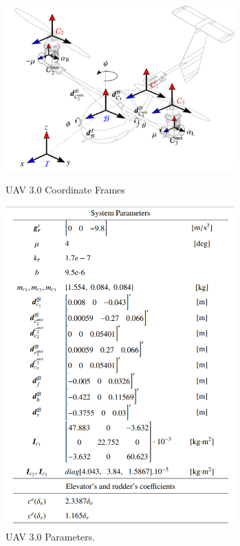 \begin{figure} [!ht]
	\centering
	\begin{minipage}{.5\textwidth}
		\centering
		\includegraphics[width=250pt]{figuras/v3frames}
		\caption{UAV 3.0 Coordinate Frames}
		\label{v3frames}
	\end{minipage}%
	\begin{minipage}{.5\textwidth}
		\centering
		\includegraphics[width=250pt]{figuras/v3tab}
		\caption{UAV 3.0 Parameters.}
		\label{v3tab}
	\end{minipage}
\end{figure}

